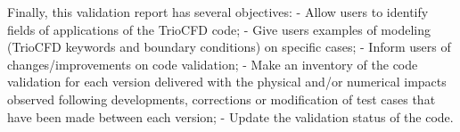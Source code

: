 Finally, this validation report has several objectives:\smallskip\newline
- Allow users to identify fields of applications of the TrioCFD code;\smallskip\newline
- Give users examples of modeling (TrioCFD keywords and boundary conditions) on specific cases;\smallskip\newline
- Inform users of changes/improvements on code validation;\smallskip\newline
- Make an inventory of the code validation for each version delivered with the physical and/or numerical impacts observed following developments, corrections or modification of test cases that have been made between each version;\smallskip\newline
- Update the validation status of the code.
